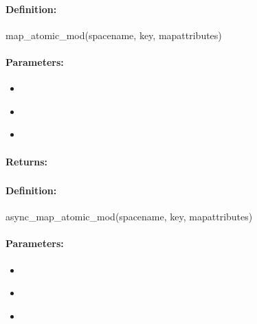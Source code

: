 \paragraph{Definition:}
\begin{rubycode}
map_atomic_mod(spacename, key, mapattributes)
\end{rubycode}

\paragraph{Parameters:}
\begin{itemize}[noitemsep]
\item {}\\

\item {}\\

\item {}\\

\end{itemize}

\paragraph{Returns:}


\pagebreak
\subsubsection{}
\label{api:ruby:async_map_atomic_mod}


\paragraph{Definition:}
\begin{rubycode}
async_map_atomic_mod(spacename, key, mapattributes)
\end{rubycode}

\paragraph{Parameters:}
\begin{itemize}[noitemsep]
\item {}\\

\item {}\\

\item {}\\

\end{itemize}

